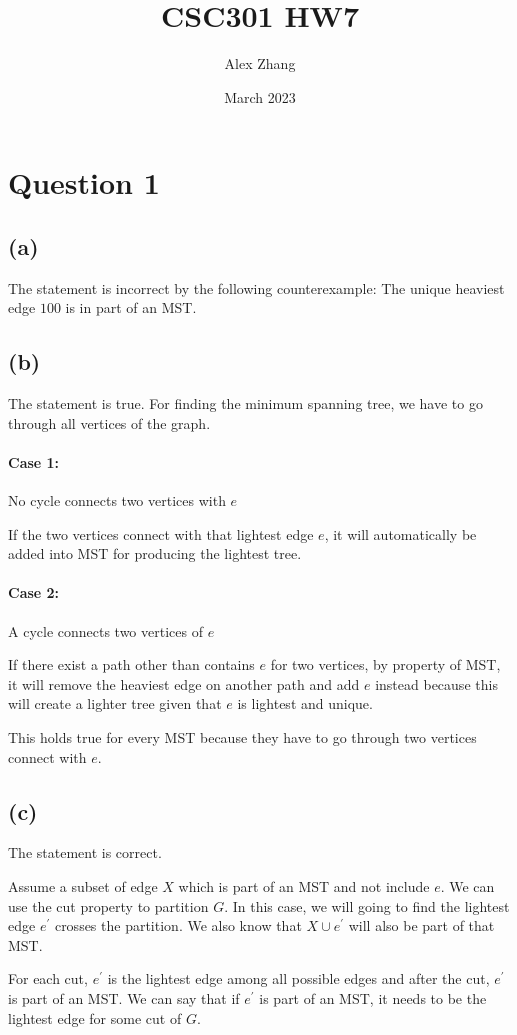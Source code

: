 \documentclass{article}
\title{CSC301 HW7}
\author{Alex Zhang}
\date{March 2023}
\begin{document}
\maketitle
\section*{Question 1}
\subsection*{(a)}
The statement is incorrect by the following counterexample:
The unique heaviest edge $100$ is in part of an MST.
\subsection*{(b)}
The statement is true. For finding the minimum spanning tree, we have to go through all vertices of the graph.
\paragraph*{Case 1:} No cycle connects two vertices with $e$

If the two vertices connect with that lightest edge $e$, it will automatically be added into MST for producing the lightest
tree.

\paragraph*{Case 2:} A cycle connects two vertices of $e$

If there exist a path other than contains $e$ for two vertices, by property of MST, it will remove the
heaviest edge on another path and add $e$ instead because this will create a lighter tree given that $e$ is lightest and unique.

This holds true for every MST because they have to go through two vertices connect with $e$.

\subsection*{(c)}
The statement is correct.

Assume a subset of edge $X$ which is part of an MST and not include $e$. We can use the cut property
to partition $G$. In this case, we will going to find the lightest edge $e^\prime$ crosses the partition.
We also know that $X \cup e^\prime$ will also be part of that MST.

For each cut, $e^\prime$ is the lightest edge among all possible edges and after the cut, $e^\prime$ is part of an MST.
We can say that if $e^\prime$ is part of an MST, it needs to be the lightest edge for some cut of $G$.
\end{document}
